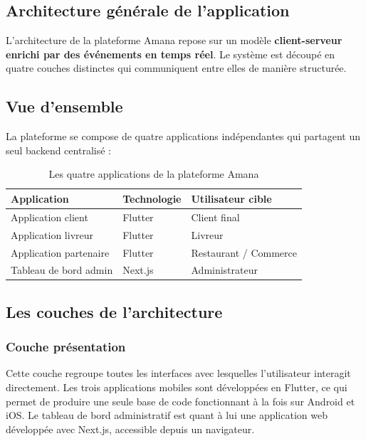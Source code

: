 \documentclass[12pt,fleqn,a4paper]{report}
\begin{document}
\begin{justify}
\section{Architecture générale de l'application}

L'architecture de la plateforme Amana repose sur un modèle
\textbf{client-serveur enrichi par des événements en temps réel}.
Le système est découpé en quatre couches distinctes qui communiquent
entre elles de manière structurée.

\subsection{Vue d'ensemble}

La plateforme se compose de quatre applications indépendantes qui
partagent un seul backend centralisé :

\begin{table}[H]
\centering
\renewcommand{\arraystretch}{1.4}
\begin{tabular}{|l|l|l|}
\hline
\textbf{Application} & \textbf{Technologie} & \textbf{Utilisateur cible} \\
\hline
Application client & Flutter & Client final \\
\hline
Application livreur & Flutter & Livreur \\
\hline
Application partenaire & Flutter & Restaurant / Commerce \\
\hline
Tableau de bord admin & Next.js & Administrateur \\
\hline
\end{tabular}
\caption{Les quatre applications de la plateforme Amana}
\end{table}

\subsection{Les couches de l'architecture}

\subsubsection{Couche présentation}
Cette couche regroupe toutes les interfaces avec lesquelles
l'utilisateur interagit directement. Les trois applications
mobiles sont développées en Flutter, ce qui permet de produire
une seule base de code fonctionnant à la fois sur Android et iOS.
Le tableau de bord administratif est quant à lui une application
web développée avec Next.js, accessible depuis un navigateur.


\end{justify}
\end{document}
